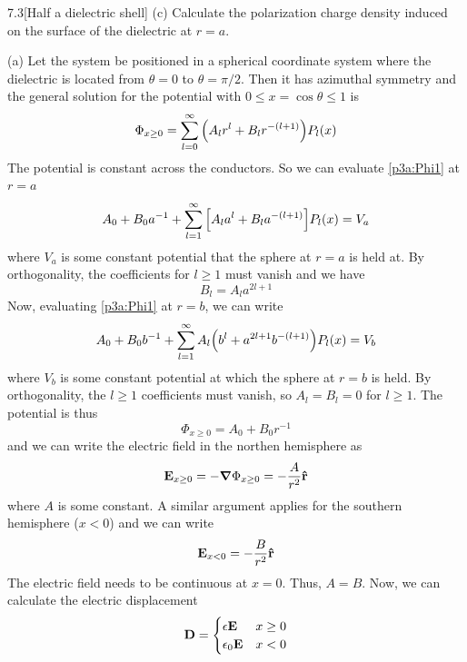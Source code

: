 \documentclass[12pt]{article}
\begin{document}
\begin{problem}{7.3}[Half a dielectric shell]
(c) Calculate the polarization charge density induced on the surface of the
dielectric at $r=a$.
\begin{solution}
(a) Let the system be positioned in a spherical coordinate system where the 
dielectric is located from $\theta=0$ to $\theta=\pi /2$. Then it has azimuthal
symmetry and the general solution for the potential with
$0\leq x=\cos\theta\leq 1$ is
\begin{equation}\label{p3a:Phi1}
    \Phi_{x\geq 0}=\sum_{l=0}^\infty \qty(A_lr^l+B_lr^{-(l+1)})P_l(x) 
\end{equation}
The potential is constant across the conductors. So we can evaluate
\eqref{p3a:Phi1} at $r=a$
\begin{equation}
    A_0+B_0a^{-1}+\sum_{l=1}^\infty\qty[A_la^l+B_la^{-(l+1)}]P_l(x)=V_a 
\end{equation}
where $V_a$ is some constant potential that the sphere at $r=a$ is held at.
By orthogonality, the coefficients for $l\geq 1$ must vanish and we have
\begin{equation}
    B_l=A_la^{2l+1} 
\end{equation}
Now, evaluating \eqref{p3a:Phi1} at $r=b$, we can write
\begin{equation}
    A_0+B_0b^{-1}+\sum_{l=1}^\infty A_l\qty(b^l+a^{2l+1}b^{-(l+1)})P_l(x)=V_b 
\end{equation}
where $V_b$ is some constant potential at which the sphere at $r=b$ is held. By
orthogonality, the $l\geq 1$ coefficients must vanish, so $A_l=B_l=0$ for $l\geq
1$. The potential is thus
\begin{equation}
    \Phi_{x\geq 0}=A_0+B_0r^{-1}
\end{equation}
and we can write the electric field in the northen hemisphere as
\begin{equation}
    \vb{E}_{x\geq 0}=-\grad\Phi_{x\geq0}=-\frac{A}{r^2}\vb{\hat{r}} 
\end{equation}
where $A$ is some constant. A similar argument applies for the southern
hemisphere ($x<0$) and we can write
\begin{equation}
    \vb{E}_{x<0}=-\frac{B}{r^2}\vb{\hat{r}} 
\end{equation}
The electric field needs to be continuous at $x=0$. Thus, $A=B$. Now, we can
calculate the electric displacement
\begin{equation}
    \vb{D}=\begin{cases}
        \epsilon\vb{E} & x\geq 0\\
        \epsilon_0\vb{E} & x<0
    \end{cases}

\end{equation}
\end{solution}
\end{problem}
\end{document}
